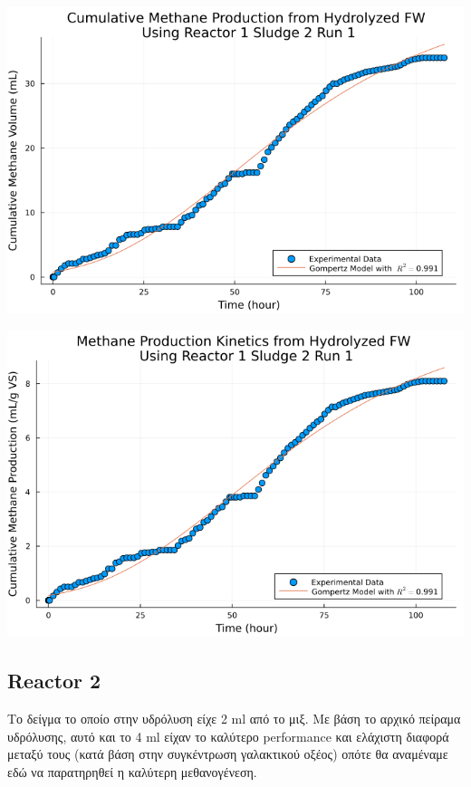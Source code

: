 \documentclass[11pt]{article}
\begin{document}
\begin{center}
\includegraphics[width=.9\linewidth]{../plots/BMPs/Hydrolyzed FW/methane_kinetics_hydrolysate_1_s2_r1_hour.png}
\end{center}

\begin{center}
\includegraphics[width=.9\linewidth]{../plots/BMPs/Hydrolyzed FW/specific_methane_kinetics_hydrolysate_1_s2_r1_hour.png}
\end{center}

\subsection{Reactor 2}
\label{sec:orgeca7adf}
Το δείγμα το οποίο στην υδρόλυση είχε 2 ml από το μιξ. Με βάση το αρχικό πείραμα υδρόλυσης, αυτό και το 4 ml είχαν το καλύτερο performance και ελάχιστη διαφορά μεταξύ τους (κατά βάση στην συγκέντρωση γαλακτικού οξέος) οπότε θα αναμέναμε εδώ να παρατηρηθεί η καλύτερη μεθανογένεση.
\end{document}

